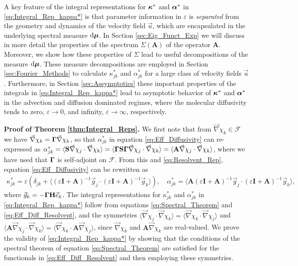 \documentclass[11pt]{amsart}
\renewcommand{\d}{\mathrm{d}}
\newcommand{\Hb}{\mathbf{H}}
\newcommand{\Ib}{\mathbf{I}}
\newcommand{\Sb}{\mathbf{S}}
\newcommand{\Ab}{\mathbf{A}}
\newcommand{\Fs}{\mathscr{F}}
\newcommand\bmu{\mbox{\boldmath${\mu}$}}
\newcommand\balpha{\mbox{\boldmath${\alpha}$}}
\newcommand\bkappa{\mbox{\boldmath${\kappa}$}}
\newcommand\bGamma{\mbox{\boldmath${\Gamma}$}}
\begin{document}
A key feature of the integral representations for $\bkappa^*$ and
$\balpha^*$ in \eqref{eq:Integral_Rep_kappa*} is that parameter
information in $\varepsilon$ is \emph{separated} from the geometry and dynamics
of the velocity field $\vec{u}$, which are encapsulated in the
underlying spectral measure $\d\bmu$. In Section
\ref{sec:Eig_Funct_Exp} we will discuss in more detail the properties
of the spectrum $\Sigma(\Ab)$ of the operator $\Ab$. Moreover, we show how
these properties of $\Sigma$ lead to useful decompositions of the
measure $\d\bmu$. These measure decompositions are employed in Section 
\ref{sec:Fourier_Methods} to calculate $\kappa^*_{jk}$ and $\alpha^*_{jk}$ for a
large class of velocity fields $\vec{u}$. Furthermore, in Section
\ref{sec:Assymptotics} these important properties of the integrals in
\eqref{eq:Integral_Rep_kappa*} lead to asymptotic behavior of
$\bkappa^*$ and $\balpha^*$ in the advection and diffusion dominated
regimes, where the molecular diffusivity tends to zero, $\varepsilon\to0$, and
infinity, $\varepsilon\to\infty$, respectively.      



\textbf{Proof of Theorem \ref{thm:Integral_Reps}.}\hspace{1ex}
%
We first note that from $\vec{\nabla}\chi_k\in\Fs$ we have 
$\vec{\nabla}\chi_k=\bGamma\vec{\nabla}\chi_k$, so that $\alpha^*_{jk}$ in equation
\eqref{eq:Eff_Diffusivity} can re-expressed as
$\alpha^*_{jk}=\langle\Sb\vec{\nabla}\chi_j\cdot\vec{\nabla}\chi_k\rangle=\langle\bGamma\Sb\bGamma\vec{\nabla}\chi_j\cdot\vec{\nabla}\chi_k\rangle  
=\langle\Ab\vec{\nabla}\chi_j\cdot\vec{\nabla}\chi_k\rangle$, where we have used that $\bGamma$ is
self-adjoint on $\Fs$. From this and \eqref{eq:Resolvent_Rep},
equation \eqref{eq:Eff_Diffusivity} can be rewritten as
%
\begin{align}\label{eq:Eff_Diff_Resolvent}
 \kappa^*_{jk}=\varepsilon\left(\delta_{jk}+\langle(\varepsilon\Ib+\Ab)^{-1}\vec{g}_j\cdot(\varepsilon\Ib+\Ab)^{-1}\vec{g}_k\rangle\right), \quad
 \alpha^*_{jk}=\langle\Ab(\varepsilon\Ib+\Ab)^{-1}\vec{g}_j\cdot(\varepsilon\Ib+\Ab)^{-1}\vec{g}_k\rangle,
\end{align}
%
where $\vec{g}_k=-\bGamma\Hb\vec{e}_k$. The integral representations
for $\kappa^*_{jk}$ and $\alpha^*_{jk}$ in \eqref{eq:Integral_Rep_kappa*} follow
from equations \eqref{eq:Spectral_Theorem} and
\eqref{eq:Eff_Diff_Resolvent}, and the symmetries
$\langle\vec{\nabla}\chi_j\cdot\vec{\nabla}\chi_k\rangle=\langle\vec{\nabla}\chi_k\cdot\vec{\nabla}\chi_j\rangle$ and 
$\langle\Ab\vec{\nabla}\chi_j\cdot\vec{\nabla}\chi_k\rangle=\langle\vec{\nabla}\chi_k\cdot\Ab\vec{\nabla}\chi_j\rangle$, since
$\vec{\nabla}\chi_k$ and $\Ab\vec{\nabla}\chi_k$ are real-valued. We prove the
validity of \eqref{eq:Integral_Rep_kappa*} by showing that the
conditions of the spectral theorem of equation
\eqref{eq:Spectral_Theorem} are satisfied for the functionals in
\eqref{eq:Eff_Diff_Resolvent} and then employing these symmetries.    
\end{document}
